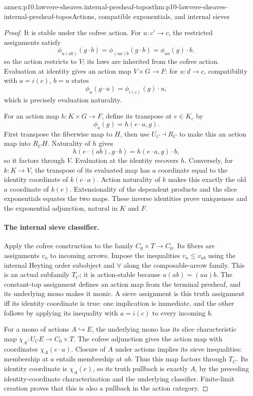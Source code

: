 \begin{annexitem}{annex:p10.lawvere-sheaves.internal-presheaf-topos}{thm:p10-lawvere-sheaves-internal-presheaf-topos}{Actions, compatible exponentials, and internal sieves}
\begin{proof}
It is stable under the cofree action.  For \(u:c'\to c\),
the restricted assignments satisfy
\[
 \phi_{u(a b)}(g\cdot b)
   =\phi_{(u a)b}(g\cdot b)
   =\phi_{u a}(g)\cdot b,
\]
so the action restricts to \(V\); its laws are inherited
from the cofree action.  Evaluation at identity gives an
action map \(V\times G\to F\): for \(u:d\to c\),
compatibility with \(a=i(c)\), \(b=u\) states
\[
             \phi_u(g\cdot u)=\phi_{i(c)}(g)\cdot u,
\]
which is precisely evaluation naturality.

For an action map \(h:K\times G\to F\), define its
transpose at \(e\in K_c\) by
\[
                \phi_a(g)=h(e\cdot a,g).
\]
First transpose the fiberwise map to \(H\), then use
\(U_C\dashv R_C\) to make this an action map into
\(R_CH\).  Naturality of \(h\) gives
\[
 h(e\cdot(a b),g\cdot b)
                =h(e\cdot a,g)\cdot b,
\]
so it factors through \(V\).  Evaluation at the identity
recovers \(h\).  Conversely, for \(k:K\to V\), the
transpose of its evaluated map has \(a\) coordinate equal
to the identity coordinate of \(k(e\cdot a)\).
Action naturality of \(k\) makes this exactly the old
\(a\) coordinate of \(k(e)\).  Extensionality of the
dependent products and the slice exponentials equates the
two maps.  These inverse identities prove uniqueness and
the exponential adjunction, natural in \(K\) and \(F\).

\paragraph{The internal sieve classifier.}
Apply the cofree construction to the family
\(C_0\times T\to C_0\).  Its fibers are assignments
\(v_a\) to incoming arrows.  Impose the inequalities
\(v_a\leq v_{a b}\) using the internal Heyting order
subobject and \(\forall\) along the composable-arrow
family.  This is an actual subfamily \(T_C\); it is
action-stable because \(u(a b)=(u a)b\).
The constant-top assignment defines an action map from
the terminal presheaf, and its underlying mono makes it
monic.  A sieve assignment is this truth assignment iff
its identity coordinate is true: one implication is
immediate, and the other follows by applying its inequality
with \(a=i(c)\) to every incoming \(b\).

For a mono of actions \(A\hookrightarrow E\), the
underlying mono has its slice characteristic map
\(\chi_A:U_CE\to C_0\times T\).  The cofree adjunction
gives the action map with coordinates
\(\chi_A(e\cdot a)\).  Closure of \(A\) under actions
implies its sieve inequalities: membership at \(a\)
entails membership at \(a b\).  Thus this map factors
through \(T_C\).  Its identity coordinate is
\(\chi_A(e)\), so its truth pullback is exactly \(A\),
by the preceding identity-coordinate characterization and
the underlying classifier.  Finite-limit creation proves
that this is also a pullback in the action category.


\end{proof}
\end{annexitem}
